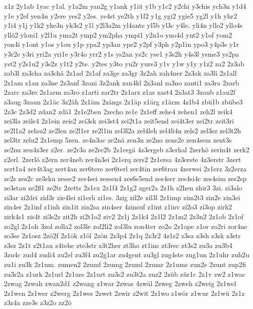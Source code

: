 {x1z
2y1ab
1yac
y1al.
y1a2m
yan2g
y1ank
y1ät
y1b
y1c2
y2chi
y3chis
ych3n
y1d4
y1e
y2ef
yen4n
y2ere
yes2
y2es.
ye4st
ye2th
y1f2
y1g
ygi2
ygie5
yg2l
y1h
yhr2
y1i4
y1j
y1k2
yke3n
yk3s2
y1l
y2l3a2m
yl4ante
yl5b
yl3c
y4le.
yli4n
yllo2
yllo4s
yllö2
yloni1
y2l1u
yma2t
ymp2
ym2pha
ympi1
y2n1o
yno4d
ynt2
y1of
yom2
yon4i
y1ont
y1os
y1ou
y1p
ypa2
yp3an
ype2
y2pf
y3ph
y2p1in
ypo3
y4p3s
y1r
y3r2e
y3ri
yri2a
yri1e
y3r4o
yrr2
y1s
ys2an
ys2c
yse1
y3s2h
y4s3l
ysme3
ys2pa
yst2
y2s1u2
y3s2z
y1t2
y2te.
y2tes
y3to
yu2r
yure3
y1v
y1w
y1y
y1z2
za2
2z3ab
zab3l
za3cha
za3chä
2z1ad
2z1af
za3ge
za3gr
3z2ah
zah4ner
2z3ak
za3li
2z1all
2z1am
z1an
za3ne
2z3anf
3zani
3z2ank
zan4kl
2z3anl
za3no
zanti1
za3ra
2zarb
2zarc
za3re
2z1arm
za3ro
z1arti
zar2tr
2z1arz
z1as
zast4
2z3at3
3zaub
z1au2f
z3aug
3zaun
2z1äc
3z2äh
2z1äm
2zängs
2z1äp
z1ärg
z1ärm
4z1b4
zbü1b
zbübe3
2z3c
2z3d2
zdan2
zdä1
2z1e2ben
2zecho
ze1e
2z1eff
zehe4
zehen1
zeh2l
zeik4
zei3la
zeile4
2z1ein
zeis2
zei3sk
zei3st4
zei2t1a
zeit5end
zei4t3er
zei2tr
zeit3ri
ze2l1a2
zelau2
ze2len
ze2l1er
ze2l1in
zel3l2a
zel4leh
zel4li4n
zels2
zel3sz
zel3t2h
zel3tr
zelu2
2z1emp
5zen.
ze4n3ac
ze2nä
zen3n
ze2no
zens2e
zen4sem
zent3s
ze2nu
zen4z3er
z2er.
ze2r3a
ze2re2b
2z1ergä
4z3ergeb
z3erhal
2zerhö
zerin4t
zerk2
z2erl.
2zerlö
z2ern
zer4neb
zer4n3ei
2z1erq
zers2
2z1ersa
4z3erste
4z3erstr
3zert
zert1a4
zer4t3ag
zert4an
zer6tere
zer6terl
zer4tin
zer6trau
4zerwei
2z1erz
3z2erza
ze2s
zes2c
ze3sku
zesse2
zes4sei
zessen4
zes6s5end
zes4ser
zes4si4c
zes4sim
zes2sp
ze3stau
ze2ß1
ze2tr
2zetts
2z1ex
2z1f4
2z1g2
zger2a
2z1h
z2hen
zhir3
3zi.
zi3alo
zi3ar
zi2dei
zid3r
zie4lei
zi1erh
zi1es.
3zig
zil2e
zil3l
2z1imp
zim2t3
zin2e
zin3ei
zin4er
2z1inf
z1inh
zin1it
zin2sa
zin4ser
4zinsuf
z1int
z1inv
zi2o3
zi3op
zirk2
zirk4s1
zis4t
zi3s2z
zit2h
zi2t1o2
ziv2
2z1j
2z1k4
2z1l2
2z1m2
2z3n2
2z1ob
2z1of
zo2gl
2z1oh
3zol
zolla2
zol3le
zol2li2
zol3lu
zon4ter
zo2o
2z1ope
z1or
zo2ri
zor4ne
zo3se
2z1osz
2zö2f
2z1ök
z1öl
2zön
2z3p4
2z1q
2z3r2
4z1s2
z3sa
z3sh
z3sk
z3str
z3sz
2z1t
z2t1au
z4tehe
zte3str
z3t2her
zt3ho
zt1ins
zt3rec
zt3s2
zu3a
zu3b4
3zu4c
zud4
zudi4
zu2el
zu3f4
zu2g1ar
zu4gent
zu3gl
zug4ste
zug1un
2z1uhr
zuh2u
zu1i
zu3k
2z1um.
zumen2
2zumf
2zumg
2zuml
2zumr
2z1ums
zun2e
2zunt
zup2fi
zu3r2a
z1urk
2z1url
2z1urs
2z1urt
zu3s2
zu3t2a
zuz2
2züb
zür1c
2z1v
zw2
z1wac
2zwag
2zwah
zwan2d1
z2wang
z1war
2zwas
4zwäl
2zweg
2zweh
z2weig
2z1wel
2z1wen
2z1wer
z2werg
2z1wes
2zwet
2zwir
z2wit
2z1wo
z1wör
z1wur
2z1wü
2z1z
z3z4a
zze3s
z3z2o
zz2ö
}

\endinput

